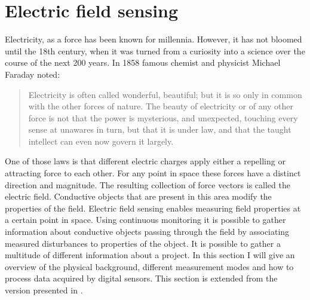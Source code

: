 \section{Electric field sensing}
Electricity, as a force has been known for millennia. However, it has not bloomed until the 18th century, when it was turned from a curiosity into a science over the course of the next 200 years. In 1858 famous chemist and physicist Michael Faraday noted:
\begin{quote}
Electricity is often called wonderful, beautiful; but it is so only in common with the other forces of nature. The beauty of electricity or of any other force is not that the power is mysterious, and unexpected, touching every sense at unawares in turn, but that it is under law, and that the taught intellect can even now govern it largely. \cite{jones1870life}
\end{quote}
One of those laws is that different electric charges apply either a repelling or attracting force to each other. For any point in space these forces have a distinct direction and magnitude. The resulting collection of force vectors is called the electric field. Conductive objects that are present in this area modify the properties of the field. Electric field sensing enables measuring field properties at a certain point in space. Using continuous monitoring it is possible to gather information about conductive objects passing through the field by associating measured disturbances to properties of the object. It is possible to gather a multitude of different information about a project. In this section I will give an overview of the physical background, different measurement modes and how to process data acquired by digital sensors. This section is extended from the version presented in \cite{braun2014capjaise}.
